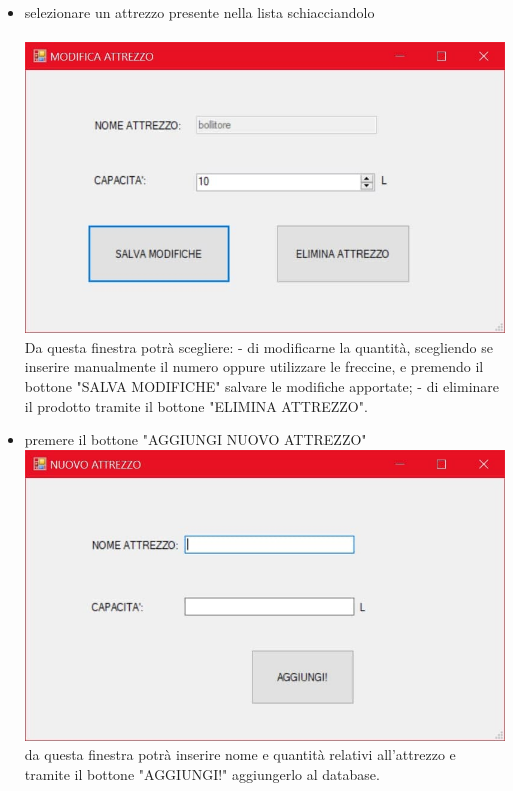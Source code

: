 \documentclass[a4paper, titlepage]{article}
\begin{document}
\begin{itemize}
    \item selezionare un attrezzo presente nella lista schiacciandolo\\\\
    \includegraphics[scale=0.30]{Immagini/form/Form ModificaAtt.jpg}
    \\Da questa finestra potrà scegliere:
        \subitem - di modificarne la quantità, scegliendo se inserire manualmente il numero oppure utilizzare le freccine, e premendo il bottone "SALVA MODIFICHE" salvare le modifiche apportate;
        \subitem - di eliminare il prodotto tramite il bottone "ELIMINA ATTREZZO".
    \item premere il bottone "AGGIUNGI NUOVO ATTREZZO"\\
    \includegraphics[scale=0.30]{Immagini/form/Form AggiuntaAtt.jpg}
    \\da questa finestra potrà inserire nome e quantità relativi all'attrezzo e tramite il bottone "AGGIUNGI!" aggiungerlo al database.
\end{itemize}
\end{document}
